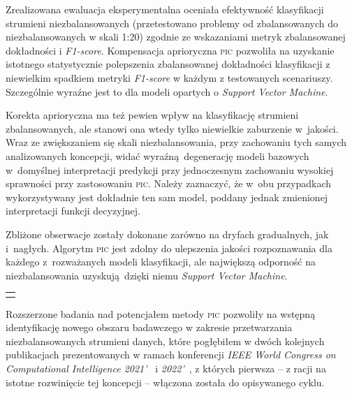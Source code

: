 Zrealizowana ewaluacja eksperymentalna oceniała efektywność klasyfikacji strumieni niezbalansowanych (przetestowano problemy od zbalansowanych do niezbalansowanych w skali 1:20) zgodnie ze wskazaniami metryk zbalansowanej dokładności i \emph{F1-score}. Kompensacja aprioryczna \textsc{pic} pozwoliła na uzyskanie istotnego statystycznie polepszenia zbalansowanej dokładności klasyfikacji z niewielkim spadkiem metryki \emph{F1-score} w każdym z testowanych scenariuszy. Szczególnie wyraźne jest to dla modeli opartych o \emph{Support Vector Machine}.


Korekta aprioryczna ma też pewien wpływ na klasyfikację strumieni zbalansowanych, ale stanowi ona wtedy tylko niewielkie zaburzenie w~jakości. Wraz ze zwiększaniem się skali niezbalansowania, przy zachowaniu tych samych analizowanych koncepcji, widać wyraźną degenerację modeli bazowych w~domyślnej interpretacji predykcji przy jednoczesnym zachowaniu wysokiej sprawności przy zastosowaniu \textsc{pic}. Należy zaznaczyć, że w~obu przypadkach wykorzystywany jest dokładnie ten sam model, poddany jednak zmienionej interpretacji funkcji decyzyjnej.

Zbliżone obserwacje zostały dokonane zarówno na dryfach gradualnych, jak i~nagłych. Algorytm \textsc{pic} jest zdolny do ulepszenia jakości rozpoznawania dla każdego z~rozważanych modeli klasyfikacji, ale największą odporność na niezbalansowania uzyskują dzięki niemu \emph{Support Vector Machine}.\vspace{1em}

{
\color{red}
\noindent\begin{tabular}{p{\textwidth}}
	\toprule &
\end{tabular}\vspace{-1em}
}
\noindent Rozszerzone badania nad potencjałem metody \textsc{pic} pozwoliły na wstępną identyfikację nowego obszaru badawczego w zakresie przetwarzania niezbalansowanych strumieni danych, które pogłębiłem w dwóch kolejnych publikacjach prezentowanych w ramach konferencji \emph{IEEE World Congress on Computational Intelligence 2021'}~ i \emph{2022'}~, z których pierwsza -- z racji na istotne rozwinięcie tej koncepcji -- włączona została do opisywanego cyklu.

